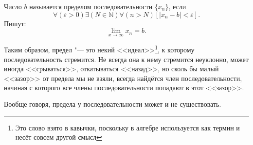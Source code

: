 \begin{opr}
	Число $b$ называется пределом последовательности $\{x_n\}$, если
	\begin{equation}
		\forall(\varepsilon > 0)\exists(N \in \mathbb{N})\forall(n>N)[|x_n-b|<\varepsilon]
		.
	\end{equation}
	Пишут:
	\begin{equation}
		\lim_{x\to \infty} x_n = b
		.
	\end{equation}
\end{opr}

Таким образом, предел "--- это некий <<идеал>>\footnote{
Это слово взято в кавычки, поскольку в алгебре используется как термин и несёт совсем другой смысл
},
к которому последовательность стремится.
Не всегда она к нему стремится неуклонно, может иногда <<срываться>>,
откатываться <<назад>>,
но сколь бы малый <<зазор>> от предела мы не взяли,
всегда найдётся член последовательности,
начиная с которого все члены последовательности попадают в этот <<зазор>>.


Вообще говоря, предела у последовательности может и не существовать.
